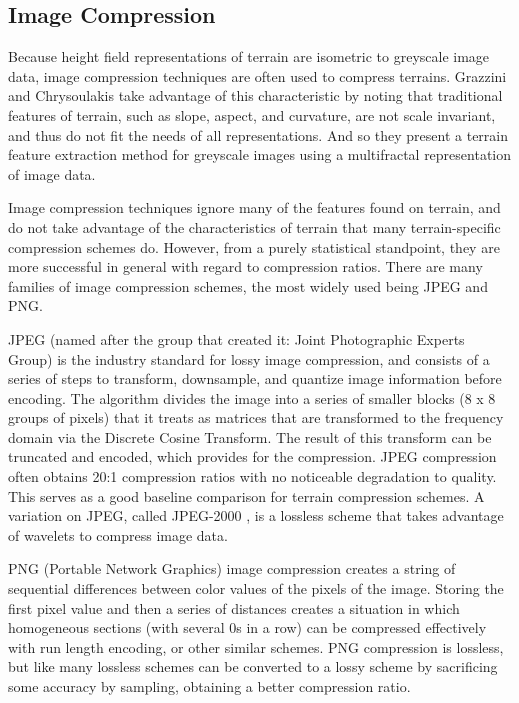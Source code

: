 \subsection{Image Compression}
\label{subsection:ImageCompression}

Because height field 
representations of terrain are isometric to greyscale image data, image compression techniques are often used to compress terrains. Grazzini and Chrysoulakis \cite{Grazzini05n.:extraction} take advantage of this characteristic by noting that traditional features of terrain, such as slope, aspect, and curvature, are not scale invariant, and thus do not fit the needs of all representations. And so they present a terrain feature extraction method for greyscale images using a multifractal representation of image data. 

Image compression techniques ignore many of the features found on terrain, and do not take advantage of the characteristics of terrain that many terrain-specific compression schemes do. However, from a purely statistical standpoint,  they are more successful in general with regard to compression ratios. There are many families of image compression schemes, the most widely used being JPEG and PNG.

JPEG (named after the group that created it: Joint Photographic Experts Group) \cite{Penn92}
is the industry standard for lossy image compression, and consists of a series of steps to transform, downsample, and quantize image information before encoding. 
The algorithm divides the image into a series of smaller blocks (8 x 8 groups of pixels) that it treats as matrices that are transformed to the frequency domain via the Discrete Cosine Transform. The result of this transform can be truncated and encoded, which provides for the compression.
JPEG compression often obtains 20:1 compression ratios with no noticeable degradation to quality. This serves as a good baseline comparison for terrain compression schemes.
% 
A variation on JPEG, called JPEG-2000 \cite{Taubman:2001:JIC:559856}, is a lossless scheme that takes advantage of wavelets to compress image data.

PNG (Portable Network Graphics) image compression \cite{316738} creates a string of sequential differences between color values of the pixels of the image. Storing the first pixel value and then a series of distances creates a situation in which homogeneous sections (with several 0s in a row) can be compressed effectively with run length encoding, or other similar schemes. PNG compression is lossless, but like many lossless schemes can be converted to a lossy scheme by sacrificing some accuracy by sampling, obtaining a better compression ratio.

